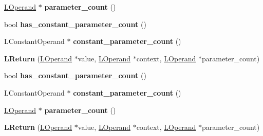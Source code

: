 \begin{DoxyCompactItemize}
\item 
\hyperlink{classv8_1_1internal_1_1_l_operand}{L\+Operand} $\ast$ {\bfseries parameter\+\_\+count} ()\hypertarget{classv8_1_1internal_1_1_l_return_ad644e156a714136b62e763b8239f04fc}{}\label{classv8_1_1internal_1_1_l_return_ad644e156a714136b62e763b8239f04fc}

\item 
bool {\bfseries has\+\_\+constant\+\_\+parameter\+\_\+count} ()\hypertarget{classv8_1_1internal_1_1_l_return_a263e1bd29a12702e4c5fc6214fbe4ca5}{}\label{classv8_1_1internal_1_1_l_return_a263e1bd29a12702e4c5fc6214fbe4ca5}

\item 
L\+Constant\+Operand $\ast$ {\bfseries constant\+\_\+parameter\+\_\+count} ()\hypertarget{classv8_1_1internal_1_1_l_return_a0453fde1ccafc982160182465d2f2e4a}{}\label{classv8_1_1internal_1_1_l_return_a0453fde1ccafc982160182465d2f2e4a}

\item 
{\bfseries L\+Return} (\hyperlink{classv8_1_1internal_1_1_l_operand}{L\+Operand} $\ast$value, \hyperlink{classv8_1_1internal_1_1_l_operand}{L\+Operand} $\ast$context, \hyperlink{classv8_1_1internal_1_1_l_operand}{L\+Operand} $\ast$parameter\+\_\+count)\hypertarget{classv8_1_1internal_1_1_l_return_af69be24dc79385d85a6b221138258d67}{}\label{classv8_1_1internal_1_1_l_return_af69be24dc79385d85a6b221138258d67}

\item 
bool {\bfseries has\+\_\+constant\+\_\+parameter\+\_\+count} ()\hypertarget{classv8_1_1internal_1_1_l_return_a263e1bd29a12702e4c5fc6214fbe4ca5}{}\label{classv8_1_1internal_1_1_l_return_a263e1bd29a12702e4c5fc6214fbe4ca5}

\item 
L\+Constant\+Operand $\ast$ {\bfseries constant\+\_\+parameter\+\_\+count} ()\hypertarget{classv8_1_1internal_1_1_l_return_a0453fde1ccafc982160182465d2f2e4a}{}\label{classv8_1_1internal_1_1_l_return_a0453fde1ccafc982160182465d2f2e4a}

\item 
\hyperlink{classv8_1_1internal_1_1_l_operand}{L\+Operand} $\ast$ {\bfseries parameter\+\_\+count} ()\hypertarget{classv8_1_1internal_1_1_l_return_ad644e156a714136b62e763b8239f04fc}{}\label{classv8_1_1internal_1_1_l_return_ad644e156a714136b62e763b8239f04fc}

\item 
{\bfseries L\+Return} (\hyperlink{classv8_1_1internal_1_1_l_operand}{L\+Operand} $\ast$value, \hyperlink{classv8_1_1internal_1_1_l_operand}{L\+Operand} $\ast$context, \hyperlink{classv8_1_1internal_1_1_l_operand}{L\+Operand} $\ast$parameter\+\_\+count)\hypertarget{classv8_1_1internal_1_1_l_return_af69be24dc79385d85a6b221138258d67}{}\label{classv8_1_1internal_1_1_l_return_af69be24dc79385d85a6b221138258d67}


\end{DoxyCompactItemize}
